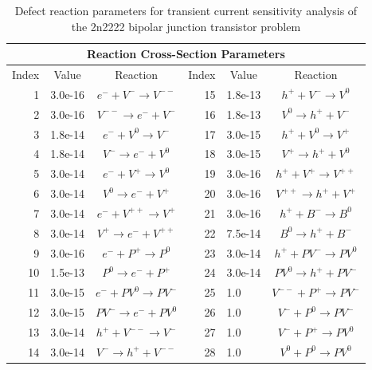 \documentclass[pdf,ps2pdf,11pt]{SANDreport}
\begin{document}
{\bsinglespace
\begin{table}[p]
\caption[Defect reaction parameters for transient current sensitivity analysis]{\label{table:ParameterKey}
Defect reaction parameters for transient current sensitivity analysis of the
2n2222 bipolar junction transistor problem}
\begin{center}
\begin{tabular}{|r|l|c|r|l|c|}
\hline 
\multicolumn{6}{|c|}{Reaction Cross-Section Parameters} \\
\hline
\multicolumn{1}{|c|}{Index} & 
\multicolumn{1}{c|}{Value} & 
\multicolumn{1}{c|}{Reaction} & 
\multicolumn{1}{c|}{Index} & 
\multicolumn{1}{c|}{Value} & 
\multicolumn{1}{c|}{Reaction} \\ 
\hline\hline
1  & 3.0e-16 & $e^- + V^-\rightarrow V^{--}$  & 15 & 1.8e-13 & $h^+ + V^- \rightarrow V^0$     \\
2  & 3.0e-16 & $V^{--} \rightarrow e^- + V^-$ & 16 & 1.8e-13 & $V^0 \rightarrow h^+ + V^-$     \\
3  & 1.8e-14 & $e^- + V^0 \rightarrow V^-$    & 17 & 3.0e-15 & $h^+ + V^0 \rightarrow V^+$     \\
4  & 1.8e-14 & $V^- \rightarrow e^- + V^0$    & 18 & 3.0e-15 & $V^+ \rightarrow h^+ + V^0$     \\ 
5  & 3.0e-14 & $e^- + V^+ \rightarrow V^0$    & 19 & 3.0e-16 & $h^+ + V^+ \rightarrow V^{++}$  \\
6  & 3.0e-14 & $V^0 \rightarrow e^- + V^+$    & 20 & 3.0e-16 & $V^{++} \rightarrow h^+ + V^+$  \\
7  & 3.0e-14 & $e^- + V^{++} \rightarrow V^+$ & 21 & 3.0e-16 & $h^+ + B^- \rightarrow B^0$     \\
8  & 3.0e-14 & $V^+ \rightarrow e^- + V^{++}$ & 22 & 7.5e-14 & $B^0 \rightarrow h^+ + B^-$     \\
9  & 3.0e-16 & $e^- + P^+ \rightarrow P^0$    & 23 & 3.0e-14& $h^+ + PV^- \rightarrow PV^0$   \\
10 & 1.5e-13 & $P^0 \rightarrow e^- + P^+$    & 24 & 3.0e-14 & $PV^0 \rightarrow h^+ + PV^-$   \\
11 & 3.0e-15 & $e^- + PV^0 \rightarrow PV^-$  & 25 & 1.0 & $V^{--} + P^+ \rightarrow PV^-$ \\
12 & 3.0e-15 & $PV^- \rightarrow e^- + PV^0$  & 26 & 1.0 & $V^- + P^0 \rightarrow PV^-$    \\
13 & 3.0e-14 & $h^+ + V^{--} \rightarrow V^-$ & 27 & 1.0 & $V^- + P^+ \rightarrow PV^0$    \\
14 & 3.0e-14 & $V^- \rightarrow h^+ + V^{--}$ & 28 & 1.0 & $V^0 + P^0 \rightarrow PV^0$    \\

\end{tabular}
\end{center}
\end{table}}
\end{document}
